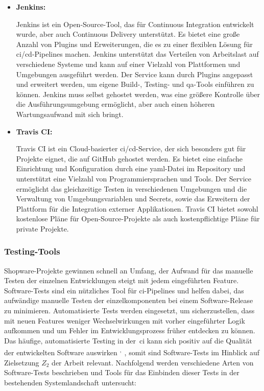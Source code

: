 \begin{itemize}
    \item{
        \textbf{Jenkins:}\par
        Jenkins ist ein Open-Source-Tool, das für Continuous Integration entwickelt wurde, aber auch Continuous Delivery
        unterstützt.
        Es bietet eine große Anzahl von Plugins und Erweiterungen, die es zu einer flexiblen Lösung für
        \acrshort{ci}/\acrshort{cd}-Pipelines machen.
        Jenkins unterstützt das Verteilen von Arbeitslast auf verschiedene Systeme und kann auf einer Vielzahl von
        Plattformen und Umgebungen ausgeführt werden.
        Der Service kann durch Plugins angepasst und erweitert werden, um eigene Build-, Testing- und
        \acrshort{qa}-Tools einführen zu können.
        Jenkins muss selbst gehostet werden, was eine größere Kontrolle über die Ausführungsumgebung ermöglicht, aber
        auch einen höheren Wartungsaufwand mit sich bringt.
    }

    \item{
        \textbf{Travis CI:}\par
        Travis CI ist ein Cloud-basierter \acrshort{ci}/\acrshort{cd}-Service, der sich besonders gut für Projekte
        eignet, die auf GitHub gehostet werden.
        Es bietet eine einfache Einrichtung und Konfiguration durch eine \acrshort{yaml}-Datei im Repository und
        unterstützt eine Vielzahl von Programmiersprachen und Tools.
        Der Service ermöglicht das gleichzeitige Testen in verschiedenen Umgebungen und die Verwaltung von
        Umgebungsvariablen und Secrets, sowie das Erweitern der Plattform für die Integration externer Applikationen.
        Travis CI bietet sowohl kostenlose Pläne für Open-Source-Projekte als auch kostenpflichtige Pläne für private
        Projekte.
    }
\end{itemize}

\subsubsection{Testing-Tools}

Shopware-Projekte gewinnen schnell an Umfang, der Aufwand für das manuelle Testen der einzelnen Entwicklungen steigt mit
jedem eingeführten Feature.
Software-Tests sind ein nützliches Tool für \acrshort{ci}-Pipelines und helfen dabei, das aufwändige manuelle Testen
der einzelkomponenten bei einem Software-Release zu minimieren.
Automatisierte Tests werden eingesetzt, um sicherzustellen, dass mit neuen Features weniger Wechselwirkungen mit vorher
eingeführter Logik aufkommen und um Fehler im Entwicklungsprozess früher entdecken zu können.
Das häufige, automatisierte Testing in der\ \acrshort{ci} kann sich positiv auf die Qualität der entwickelten
Software auswirken
\textsuperscript{,\ }, somit sind
Software-Tests im Hinblick auf Zielsetzung $Z_2$ der Arbeit relevant.
Nachfolgend werden verschiedene Arten von Software-Tests beschrieben und Tools für das Einbinden dieser Tests in der
bestehenden Systemlandschaft untersucht:

